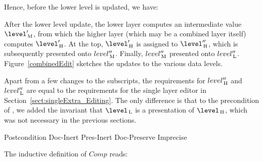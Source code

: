 Hence, before the lower level is updated, we have:


After the lower level update, the lower layer computes an intermediate value $\level'\M$, from which the higher layer (which may be a combined layer itself) computes $\level'\H$. At the top, $\level'\H$ is assigned to $\level''\H$, which is subsequently presented onto $level''_{\, \mathrm M}$. Finally, $level''_{\, \mathrm M}$ presented onto $level''_{\, \mathrm L}$. Figure~\ref{combinedEdit} sketches the updates to the various data levels.


Apart from a few changes to the subscripts, the requirements for $level''_{\, \mathrm H}$ and $level''_{\, \mathrm L}$ are equal to the requirements for the single layer editor in Section~\ref{sect:singleExtra_Editing}. The only difference is that to the precondition of , we added the invariant that $\level\L$ is a presentation of $\level\H$, which was not necessary in the previous sections. 

		{Postcondition}
  {Doc-Inert}
		{Pres-Inert}
	{Doc-Preserve}
	{Imprecise}

The inductive definition of $Comp$ reads:


